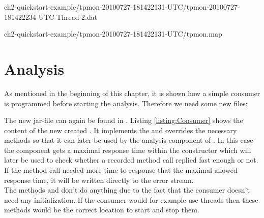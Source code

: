 
\setBashListing
%
{ch2-quickstart-example/tpmon-20100727-181422131-UTC/tpmon-20100727-181422234-UTC-Thread-2.dat}

%
{ch2-quickstart-example/tpmon-20100727-181422131-UTC/tpmon.map}

\section{Analysis}\label{sec:example:analysis}
As mentioned in the beginning of this chapter, it is shown how a simple consumer is programmed before starting the analysis. Therefore we need some new files:

\vspace{1ex}
\vspace{1ex}
		
The new jar-file can again be found in . Listing \ref{listing:Consumer} shows the content of the new created . It implements the  and overrides the necessary methods so that it can later be used by the analysis component of \Kieker. In this case the component gets a maximal response time within the constructor which will later be used to check whether a recorded method call replied fast enough or not. If the method call needed more time to response that the maximal allowed response time, it will be written directly to the error stream.\\
The methods  and  don't do anything due to the fact that the consumer doesn't need any initialization. If the consumer would for example use threads then these methods would be the correct location to start and stop them.

\setJavaCodeListing       


